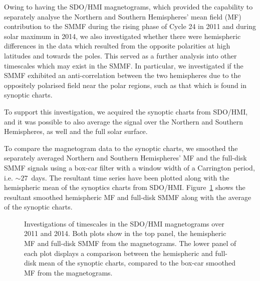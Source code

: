 Owing to having the SDO/HMI magnetograms, which provided the capability to separately analyse the Northern and Southern Hemispheres' mean field (MF) contribution to the SMMF during the rising phase of Cycle 24 in 2011 and during solar maximum in 2014, we also investigated whether there were hemispheric differences in the data which resulted from the opposite polarities at high latitudes and towards the poles. This served as a further analysis into other timescales which may exist in the SMMF. In particular, we investigated if the SMMF exhibited an anti-correlation between the two hemispheres due to the oppositely polarised field near the polar regions, such as that which is found in synoptic charts.

To support this investigation, we acquired the synoptic charts from SDO/HMI, and it was possible to also average the signal over the Northern and Southern Hemispheres, as well and the full solar surface.

To compare the magnetogram data to the synoptic charts, we smoothed the separately averaged Northern and Southern Hemispheres' MF and the full-disk SMMF signals using a box-car filter with a window width of a Carrington period, i.e. $\sim 27$~days. The resultant time series have been plotted along with the hemispheric mean of the synoptics charts from SDO/HMI. Figure~\ref{fig:HMI_MF_vs_synoptics} shows the resultant smoothed hemispheric MF and full-disk SMMF along with the average of the synoptic charts.

\begin{figure}[!ht]
	\centering
	\qquad
	\caption{Investigations of timescales in the SDO/HMI magnetograms over 2011 and 2014. Both plots show in the top panel, the hemispheric MF and full-disk SMMF from the magnetograms. The lower panel of each plot displays a comparison between the hemispheric and full-disk mean of the synoptic charts, compared to the box-car smoothed MF from the magnetograms.}
	\label{fig:HMI_MF_vs_synoptics}
\end{figure}

